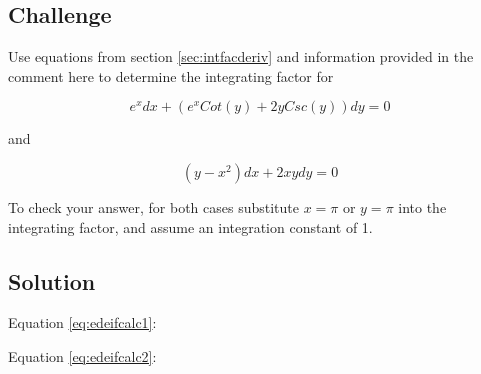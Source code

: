 \subsection*{Challenge}
Use equations from section \ref{sec:intfacderiv} and information provided in the comment here to determine the integrating factor for

\begin{equation}
    \label{eq:edeifcalc1}
    e^x dx + (e^x Cot(y) + 2y Csc(y)) dy = 0
\end{equation}

and

\begin{equation}
    \label{eq:edeifcalc2}
    (y-x^2) dx + 2xy dy = 0
\end{equation}

To check your answer, for both cases substitute $x=\pi$ or $y=\pi$ into the integrating factor, and assume an integration constant of 1.

\subsection*{Solution}


Equation \ref{eq:edeifcalc1}: 

Equation \ref{eq:edeifcalc2}: 


\timebox




